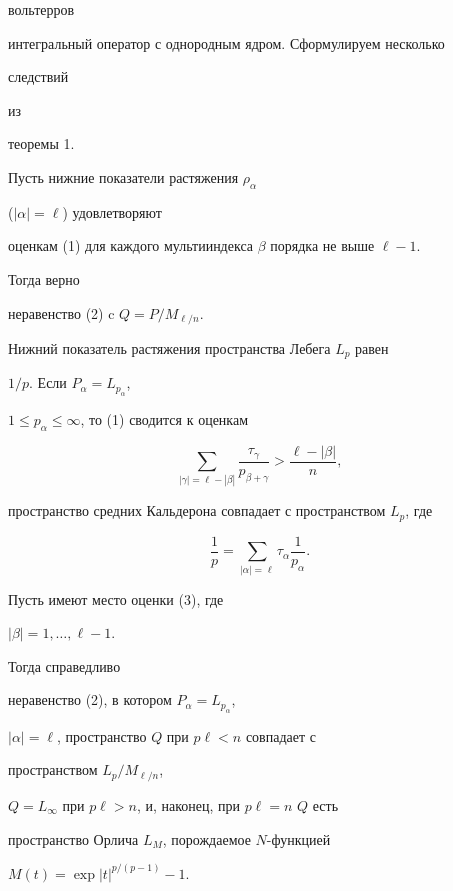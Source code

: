 вольтерров 


интегральный оператор с однородным ядром. Сформулируем несколько 


следствий  


из 


теоремы 1. 


 


\begin{cor} Пусть нижние показатели растяжения $\rho_\alpha$ 


($|\alpha|=\ell$) удовлетворяют 


оценкам (1) для каждого мультииндекса $\beta$ порядка не выше $\ell-1$. 


Тогда верно 


неравенство (2) c $Q=P/M_{\ell/n}$.


\end{cor} 


 


Нижний показатель растяжения пространства Лебега $L_p$ равен 


$1/p$. Если $P_\alpha=L_{p_\alpha}$, 


$1\le p_\alpha\le\infty$, то (1) сводится к оценкам 


\begin{equation} 


\sum_{|\gamma|=\ell-|\beta|} 


\frac{\tau_\gamma}{p_{\beta+\gamma}}>\frac{\ell-|\beta|}{n}, 


\end{equation} 


пространство средних Кальдерона совпадает с пространством $L_p$, где 


$$ 


\frac{1}{p}=\sum_{|\alpha|=\ell}\tau_\alpha\frac{1}{p_\alpha}. 


$$ 


 


\begin{cor} Пусть имеют место оценки (3), где 


$|\beta|=1,\dotsc,\ell-1$. 


Тогда справедливо 


неравенство (2), в котором $P_\alpha=L_{p_\alpha}$, 


$|\alpha|=\ell$, пространство $Q$ при $p\ell<n$ совпадает с 


пространством $L_p/M_{\ell/n}$, 


$Q=L_\infty$ при $p\ell>n$, и, наконец, при $p\ell=n$\; $Q$ есть 


пространство Орлича $L_M$, порождаемое $N$-функцией 


$M(t)=\exp|t|^{p/(p-1)}-1$. 


\end{cor} 


